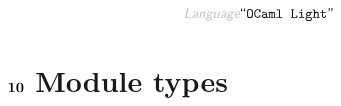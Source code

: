 \begin{displaymath}
\KEY{Language} \STRING{OCaml Light}
\end{displaymath}

\section*{$\SECT{10}$ Module types}\hypertarget{sect10-module-types}{}\label{sect10-module-types}

